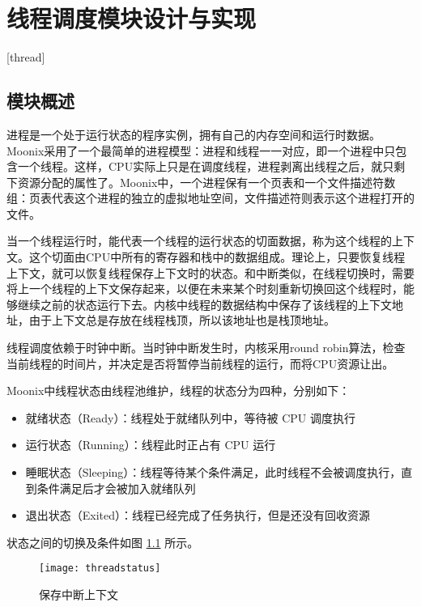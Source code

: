 
\chapter{线程调度模块设计与实现}[thread]
\label{chapter:thread}

\section{模块概述}

进程是一个处于运行状态的程序实例，拥有自己的内存空间和运行时数据。Moonix采用了一个最简单的进程模型：进程和线程一一对应，即一个进程中只包含一个线程。这样，CPU实际上只是在调度线程，进程剥离出线程之后，就只剩下资源分配的属性了。Moonix中，一个进程保有一个页表和一个文件描述符数组：页表代表这个进程的独立的虚拟地址空间，文件描述符则表示这个进程打开的文件。

当一个线程运行时，能代表一个线程的运行状态的切面数据，称为这个线程的上下文。这个切面由CPU中所有的寄存器和栈中的数据组成。理论上，只要恢复线程上下文，就可以恢复线程保存上下文时的状态。和中断类似，在线程切换时，需要将上一个线程的上下文保存起来，以便在未来某个时刻重新切换回这个线程时，能够继续之前的状态运行下去。内核中线程的数据结构中保存了该线程的上下文地址，由于上下文总是存放在线程栈顶，所以该地址也是栈顶地址。

线程调度依赖于时钟中断。当时钟中断发生时，内核采用round robin算法\cite{DBLP:journals/eor/RasmussenT08}，检查当前线程的时间片，并决定是否将暂停当前线程的运行，而将CPU资源让出。

Moonix中线程状态由线程池维护，线程的状态分为四种，分别如下：

\begin{itemize}
	\item 就绪状态（Ready）：线程处于就绪队列中，等待被 CPU 调度执行
	\item 运行状态（Running）：线程此时正占有 CPU 运行
	\item 睡眠状态（Sleeping）：线程等待某个条件满足，此时线程不会被调度执行，直到条件满足后才会被加入就绪队列
	\item 退出状态（Exited）：线程已经完成了任务执行，但是还没有回收资源
\end{itemize}

状态之间的切换及条件如图 \ref{pic:threadstatus} 所示。

\begin{figure}[htpb]
	\centering
	\texttt{[image: threadstatus]}
	\setlength{\abovecaptionskip}{2pt}
	\caption{保存中断上下文}
	\label{pic:threadstatus}
\end{figure}

